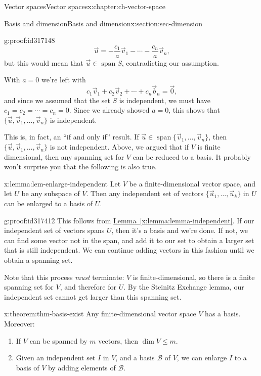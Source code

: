 \documentclass[oneside,10pt,]{book}
\numberwithin{equation}{section}
\newcommand{\spn}{\operatorname{span}}
\begin{document}
\begin{chapterptx}{Vector spaces}{}{Vector spaces}{}{}{x:chapter:ch-vector-space}
\begin{sectionptx}{Basis and dimension}{}{Basis and dimension}{}{}{x:section:sec-dimension}
\begin{proofptx}{}{g:proof:id317148}
\begin{equation*}
\vec{u} = -\frac{c_1}{a}\vec{v}_1-\cdots -\frac{c_n}{a}\vec{v}_n\text{,}
\end{equation*}
but this would mean that \(\vec{u}\in \spn S\), contradicting our assumption.%
\par
With \(a=0\) we're left with%
\begin{equation*}
c_1\vec{v}_1+c_2\vec{v}_2+\cdots +c_n\vec{b}_n=\vec{0}\text{,}
\end{equation*}
and since we assumed that the set \(S\) is independent, we must have \(c_1=c_2=\cdots=c_n=0\). Since we already showed \(a=0\), this shows that \(\{\vec{u},\vec{v}_1,\ldots, \vec{v}_n\}\) is independent.%
\end{proofptx}
This is, in fact, an ``if and only if'' result. If \(\vec{u}\in\spn\{\vec{v}_1,\ldots, \vec{v}_n\}\), then \(\{\vec{u},\vec{v}_1,\ldots, \vec{v}_n\}\) is not independent. Above, we argued that if \(V\) is finite dimensional, then any spanning set for \(V\) can be reduced to a basis. It probably won't surprise you that the following is also true.%
\begin{lemma}{}{}{x:lemma:lem-enlarge-independent}%
Let \(V\) be a finite-dimensional vector space, and let \(U\) be any subspace of \(V\). Then any independent set of vectors \(\{\vec{u}_1,\ldots, \vec{u}_k\}\) in \(U\) can be enlarged to a basis of \(U\).%
\end{lemma}
\begin{proofptx}{}{g:proof:id317412}
This follows from \hyperref[x:lemma:lemma-independent]{Lemma~\ref{x:lemma:lemma-independent}}. If our independent set of vectors spans \(U\), then it's a basis and we're done. If not, we can find some vector not in the span, and add it to our set to obtain a larger set that is still independent. We can continue adding vectors in this fashion until we obtain a spanning set.%
\par
Note that this process \emph{must} terminate: \(V\) is finite-dimensional, so there is a finite spanning set for \(V\), and therefore for \(U\). By the Steinitz Exchange lemma, our independent set cannot get larger than this spanning set.%
\end{proofptx}
\begin{theorem}{}{}{x:theorem:thm-basis-exist}%
Any finite-dimensional vector space \(V\) has a basis. Moreover:%
\begin{enumerate}
\item{}If \(V\) can be spanned by \(m\) vectors, then \(\dim V\leq m\).%
\item{}Given an independent set \(I\) in \(V\), and a basis \(\mathcal{B}\) of \(V\), we can enlarge \(I\) to a basis of \(V\) by adding elements of \(\mathcal{B}\).%

\end{enumerate}
\end{theorem}
\end{sectionptx}
\end{chapterptx}
\end{document}
